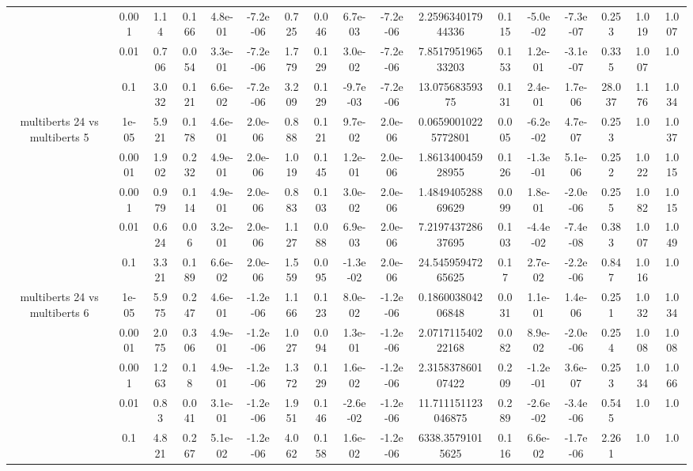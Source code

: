 \begin{tabular}{|c|c|c|c|c|c|c|c|c|c|c|c|c|c|c|c|c|}
 & 0.001 & 1.14 & 0.166 & 4.8e-01 & -7.2e-06 & 0.725 & 0.046 & 6.7e-03 & -7.2e-06 & 2.259634017944336 & 0.115 & -5.0e-02 & -7.3e-07 & 0.253 & 1.019 & 1.007 \\
 & 0.01 & 0.706 & 0.054 & 3.3e-01 & -7.2e-06 & 1.779 & 0.129 & 3.0e-02 & -7.2e-06 & 7.851795196533203 & 0.153 & 1.2e-01 & -3.1e-07 & 0.335 & 1.007 & 1.0 \\
 & 0.1 & 3.032 & 0.121 & 6.6e-02 & -7.2e-06 & 3.209 & 0.129 & -9.7e-03 & -7.2e-06 & 13.07568359375 & 0.131 & 2.4e-01 & 1.7e-06 & 28.037 & 1.176 & 1.034 \\
\hline
\multirow{5}{*}{multiberts 24 vs multiberts 5} & 1e-05 & 5.921 & 0.178 & 4.6e-01 & 2.0e-06 & 0.888 & 0.121 & 9.7e-02 & 2.0e-06 & 0.06590010225772801 & 0.005 & -6.2e-02 & 4.7e-07 & 0.253 & 1.0 & 1.037 \\
 & 0.0001 & 1.902 & 0.232 & 4.9e-01 & 2.0e-06 & 1.019 & 0.145 & 1.2e-01 & 2.0e-06 & 1.861340045928955 & 0.126 & -1.3e-01 & 5.1e-06 & 0.252 & 1.022 & 1.015 \\
 & 0.001 & 0.979 & 0.114 & 4.9e-01 & 2.0e-06 & 0.883 & 0.103 & 3.0e-02 & 2.0e-06 & 1.484940528869629 & 0.099 & 1.8e-01 & -2.0e-06 & 0.255 & 1.082 & 1.015 \\
 & 0.01 & 0.624 & 0.06 & 3.2e-01 & 2.0e-06 & 1.127 & 0.088 & 6.9e-03 & 2.0e-06 & 7.219743728637695 & 0.103 & -4.4e-02 & -7.4e-08 & 0.383 & 1.007 & 1.049 \\
 & 0.1 & 3.321 & 0.189 & 6.6e-02 & 2.0e-06 & 1.559 & 0.095 & -1.3e-02 & 2.0e-06 & 24.54595947265625 & 0.17 & 2.7e-02 & -2.2e-06 & 0.847 & 1.016 & 1.0 \\
\hline
\multirow{5}{*}{multiberts 24 vs multiberts 6} & 1e-05 & 5.975 & 0.247 & 4.6e-01 & -1.2e-06 & 1.166 & 0.123 & 8.0e-02 & -1.2e-06 & 0.186003804206848 & 0.031 & 1.1e-01 & 1.4e-06 & 0.251 & 1.032 & 1.034 \\
 & 0.0001 & 2.075 & 0.306 & 4.9e-01 & -1.2e-06 & 1.027 & 0.094 & 1.3e-01 & -1.2e-06 & 2.071711540222168 & 0.082 & 8.9e-02 & -2.0e-06 & 0.254 & 1.008 & 1.008 \\
 & 0.001 & 1.263 & 0.18 & 4.9e-01 & -1.2e-06 & 1.372 & 0.129 & 1.6e-02 & -1.2e-06 & 2.315837860107422 & 0.209 & -1.2e-01 & 3.6e-07 & 0.253 & 1.034 & 1.066 \\
 & 0.01 & 0.83 & 0.041 & 3.1e-01 & -1.2e-06 & 1.951 & 0.146 & -2.6e-02 & -1.2e-06 & 11.711151123046875 & 0.289 & -2.6e-02 & -3.4e-06 & 0.545 & 1.0 & 1.0 \\
 & 0.1 & 4.821 & 0.267 & 5.1e-02 & -1.2e-06 & 4.062 & 0.158 & 1.6e-02 & -1.2e-06 & 6338.35791015625 & 0.116 & 6.6e-02 & -1.7e-06 & 2.261 & 1.0 & 1.0 \\

\end{tabular}

